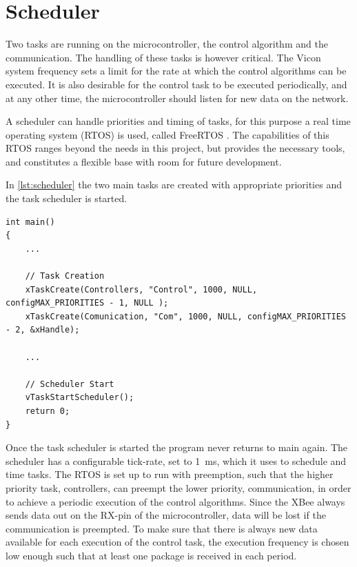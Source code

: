 \section{Scheduler}\label{sec:Scheduler}
Two tasks are running on the microcontroller, the control algorithm and the communication. The handling of these tasks is however critical. The Vicon system frequency sets a limit for the rate at which the control algorithms can be executed. It is also desirable for the control task to be executed periodically, and at any other time, the microcontroller should listen for new data on the network.

A scheduler can handle priorities and timing of tasks, for this purpose a real time operating system (RTOS) is used, called FreeRTOS \cite{freeRtos}. The capabilities of this RTOS ranges beyond the needs in this project, but provides the necessary tools, and constitutes a flexible base with room for future development.

In \autoref{lst:scheduler} the two main tasks are created with appropriate priorities and the task scheduler is started.

\begin{lstlisting}[style=customcpp,
                    caption={Code for initialization, creation of the different tasks, start sequence for the motors and call to the scheduler.}, 
                    label=lst:scheduler]
int main()
{
    ... 
    
    // Task Creation
    xTaskCreate(Controllers, "Control", 1000, NULL, configMAX_PRIORITIES - 1, NULL );
    xTaskCreate(Comunication, "Com", 1000, NULL, configMAX_PRIORITIES - 2, &xHandle);
    
    ...
 
    // Scheduler Start
    vTaskStartScheduler();
    return 0;
}
\end{lstlisting}

Once the task scheduler is started the program never returns to main again. The scheduler has a configurable tick-rate, set to \SI{1}{ms}, which it uses to schedule and time tasks. The RTOS is set up to run with preemption, such that the higher priority task, controllers, can preempt the lower priority, communication, in order to achieve a periodic execution of the control algorithms. Since the XBee always sends data out on the RX-pin of the microcontroller, data will be lost if the communication is preempted. To make sure that there is always new data available for each execution of the control task, the execution frequency is chosen low enough such that at least one package is received in each period.

